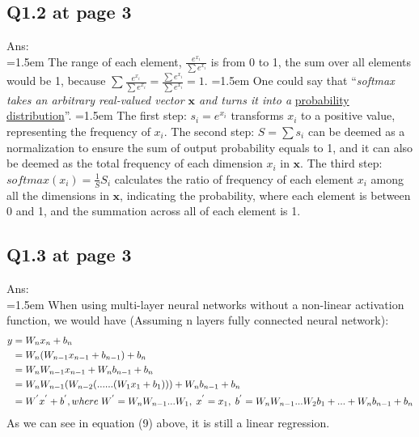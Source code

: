 \documentclass{article}
\begin{document}
	\subsection*{Q1.2 at page 3}
	Ans:\\
	\hangindent=1.5em \hspace{1.5em} The range of each element, $\frac{e^{x_i}}{\sum e^{x_i}}$ is from 0 to 1, the sum over all elements would be 1, because  $\sum \frac{e^{x_i}}{\sum e^{x_i}} = \frac{\sum e^{x_i}}{\sum e^{x_i}} = 1$. \newline
	\newline
	\hangindent=1.5em \hspace{1.5em} One could say that “\textit{softmax takes an arbitrary real-valued vector $\mathbf{x}$ and turns it into a} \underline{probability distribution}”. \newline
	\newline
	\hangindent=1.5em \hspace{1.5em} The first step: $s_i = e^{x_i}$ transforms $x_i$ to a positive value, representing the frequency of $x_i$. The second step: $S = \sum s_i$ can be deemed as a normalization to ensure the sum of output probability equals to 1, and it can also be deemed as the total frequency of each dimension $x_i$ in $\mathbf{x}$. The third step: $softmax(x_i) = \frac{1}{S}S_i$ calculates the ratio of frequency of each element $x_i$ among all the dimensions in $\mathbf{x}$, indicating the probability, where each element is between 0 and 1, and the summation across all of each element is 1.

	\newpage
	\subsection*{Q1.3 at page 3}
	Ans:\\
	\hangindent=1.5em \hspace{1.5em} When using multi-layer neural networks without a non-linear activation function, we would have (Assuming n layers fully connected neural network):
	\begin{align}
		y &= W_nx_n + b_n \\
		&= W_n(W_{n-1}x_{n-1} + b_{n-1}) + b_n\\
		&= W_nW_{n-1}x_{n-1} + W_nb_{n-1} + b_n\\
		&= W_nW_{n-1}(W_{n-2}(......(W_1x_{1} + b_1))) + W_nb_{n-1} + b_n \\
		&= W^{'}x^{'} + b^{'}, where \hspace{1mm} W^{'} = W_{n}W_{n-1}...W_1, \hspace{1mm}x^{'} = x_{1}, \hspace{1mm}b^{'} = W_nW_{n-1}...W_{2}b_1 + ... + W_{n}b_{n-1} + b_n
	\end{align}	
	As we can see in equation (9) above, it is still a linear regression.
	
\end{document}
